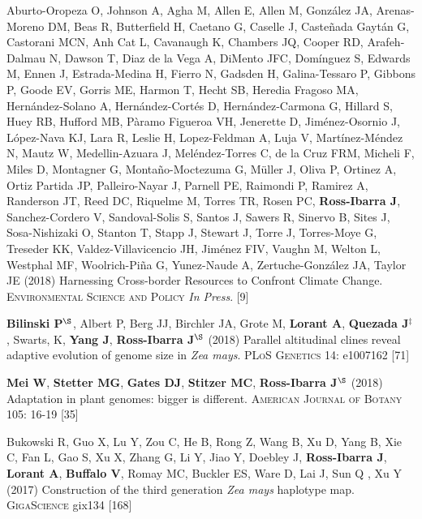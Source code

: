 \documentclass[letterpaper,10pt]{article}
\begin{document}
\begin{etaremune}
\item  Aburto-Oropeza O, Johnson A, Agha M, Allen E,  Allen M,  Gonz\'{a}lez JA, Arenas-Moreno DM, Beas R, Butterfield H, Caetano G, Caselle J, Caste\~{n}ada Gayt\'{a}n G, Castorani MCN, Anh Cat L, Cavanaugh K, Chambers JQ, Cooper RD, Arafeh-Dalmau N, Dawson T, Diaz de la Vega A, DiMento JFC, Dom\'{i}nguez S, Edwards M, Ennen J, Estrada-Medina H, Fierro N, Gadsden H, Galina-Tessaro P, Gibbons P, Goode EV, Gorris ME, Harmon T, Hecht SB, Heredia Fragoso MA, Hern\'{a}ndez-Solano A, Hern\'{a}ndez-Cort\'{e}s D, Hern\'{a}ndez-Carmona G, Hillard S, Huey RB, Hufford MB, P\`{a}ramo Figueroa VH, Jenerette D, Jim\'{e}nez-Osornio J, L\'{o}pez-Nava KJ, Lara R, Leslie H, Lopez-Feldman A, Luja V, Mart\'{i}nez-M\'{e}ndez N, Mautz W, Medellin-Azuara J, Mel\'{e}ndez-Torres C, de la Cruz FRM,  Micheli F, Miles D, Montagner G, Monta\~{n}o-Moctezuma G, M\"{u}ller J, Oliva P, Ortinez A, Ortiz Partida JP, Palleiro-Nayar J, Parnell PE, Raimondi P, Ramirez A, Randerson JT, Reed DC, Riquelme M, Torres TR, Rosen PC, {\bf Ross-Ibarra J}, Sanchez-Cordero V, Sandoval-Solis S, Santos J, Sawers R, Sinervo B, Sites J,  Sosa-Nishizaki O, Stanton T, Stapp J, Stewart J, Torre J,  Torres-Moye G, Treseder KK, Valdez-Villavicencio JH, Jim\'{e}nez FIV, Vaughn M, Welton L, Westphal MF, Woolrich-Pi\~{n}a G,  Yunez-Naude A, Zertuche-Gonz\'{a}lez JA, Taylor JE (2018)
Harnessing Cross-border Resources to Confront Climate Change.  \textsc{Environmental Science and Policy} \textit{In Press}.
 [9]\\

\item \textbf{Bilinski P}$^\S$, Albert P, Berg JJ, Birchler JA, Grote M, \textbf{Lorant A}, \textbf{Quezada J}$^\ddagger$, Swarts, K, \textbf{Yang J}, \textbf{Ross-Ibarra J}$^\S$ (2018) Parallel altitudinal clines reveal adaptive evolution of genome size in \textit{Zea mays}. \textsc{PLoS Genetics} 14: e1007162
 [71]\\

\item {\bf Mei W}, {\bf Stetter MG}, {\bf Gates DJ}, {\bf Stitzer MC}, {\bf Ross-Ibarra J}$^\S$ (2018) Adaptation in plant genomes: bigger is different.  \textsc{American Journal of Botany} 105: 16-19
 [35]\\

\item Bukowski R, Guo X, Lu Y, Zou C, He B, Rong Z, Wang B,  Xu D,  Yang B, Xie C,  Fan L, Gao S, Xu X, Zhang G, Li Y, Jiao Y, Doebley J, {\bf Ross-Ibarra J}, {\bf Lorant A}, {\bf Buffalo V}, Romay MC, Buckler ES, Ware D, Lai J, Sun Q , Xu Y (2017) Construction of the third generation \emph{Zea mays} haplotype map. \textsc{GigaScience} gix134
 [168]\\


\end{etaremune}
\end{document}
